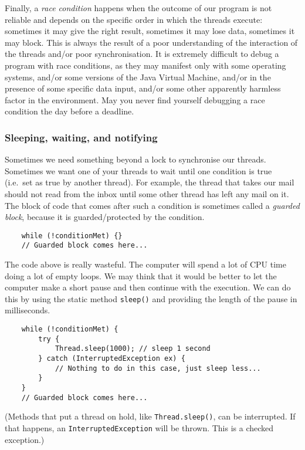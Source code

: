 Finally, a \emph{race condition} happens when the outcome of our
program is not reliable and depends on the specific order in which the
threads execute: sometimes it may give the right result, sometimes it
may lose data, sometimes it may block. This is always the result of a
poor understanding of the interaction of the threads and/or poor
synchronisation. It is extremely difficult to debug a program with
race conditions, as they may manifest only with some operating
systems, and/or some versions of the Java Virtual Machine, 
and/or in the presence of some specific data input, and/or
some other apparently harmless factor in the environment. May you
never find yourself debugging a race condition the day before a
deadline. 

\subsubsection{Sleeping, waiting, and notifying}
\label{sec:sleep-wait-notify}

Sometimes we need something beyond a lock to synchronise our threads. 
Sometimes we want one of your threads to wait until one condition is
true (i.e.~set as true by another thread). For example, the thread
that takes our mail should not read from the inbox until some other
thread has left any mail on it. The block of code that comes after
such a condition is sometimes called a \emph{guarded block}, because
it is guarded/protected by the condition. 

\begin{verbatim}
    while (!conditionMet) {}
    // Guarded block comes here...
\end{verbatim}

The code above is really wasteful. The computer will spend a lot of
CPU time doing a lot of empty loops. We may think that it would be
better to let the computer make a short pause and then continue with
the execution. We can do this by using the static method
\verb+sleep()+ and providing the length of the pause in milliseconds. 

\begin{verbatim}
    while (!conditionMet) {
        try {
            Thread.sleep(1000); // sleep 1 second
        } catch (InterruptedException ex) {
            // Nothing to do in this case, just sleep less...
        }
    }  
    // Guarded block comes here...
\end{verbatim}

(Methods that put a thread on hold, like \verb+Thread.sleep()+, can be
interrupted. If that happens, an \verb+InterruptedException+ will be
thrown. This is a checked exception.)

